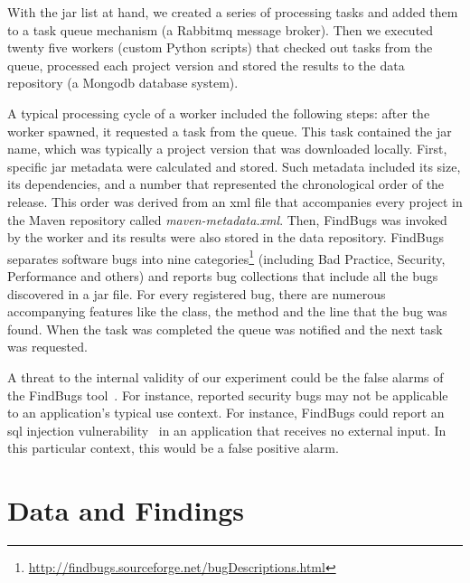\documentclass{sig-alternate}
\begin{document}
With the {\sc jar} list at hand, we created a series of processing tasks
and added them to a task queue mechanism (a Rabbit{\sc mq} message
broker). Then we executed twenty five workers (custom Python scripts)
that checked out tasks from the queue, processed each project version
and stored the results to the data
repository (a Mongo{\sc db} database system).

A typical processing cycle of a worker included the following steps: after
the worker spawned, it requested a task from the queue. This task contained
the {\sc jar} name, which was typically a project version that was downloaded locally.
First, specific {\sc jar} metadata were calculated and stored. Such metadata included
its size, its dependencies, and a number that represented the chronological order of the
release. This order was derived from an {\sc xml} file that
accompanies every project in the Maven repository called {\it
maven-metadata.xml}. Then, FindBugs was invoked by the worker and its results were
also stored in the data repository. 
FindBugs separates software bugs into nine
categories\footnote{\url{http://findbugs.sourceforge.net/bugDescriptions.html}}
(including Bad Practice, Security, Performance and others)
and reports bug collections that include all the bugs discovered in a
{\sc jar} file. For every registered bug, there are numerous accompanying features
like the class, the method and the line that the bug was found.
When the task was completed the queue
was notified and the next task was requested.

A threat to the internal validity of our experiment
could be the false alarms of the
FindBugs tool~\cite{AP10, HP04}.
For instance, reported security bugs may not
be applicable to an application's typical use context.
For instance, FindBugs could report an {\sc sql}
injection vulnerability~\cite{RL12}
in an application that receives no external input.
In this particular context, this would be a false positive alarm.

\section{Data and Findings}
\label{sec:find}
\end{document}
